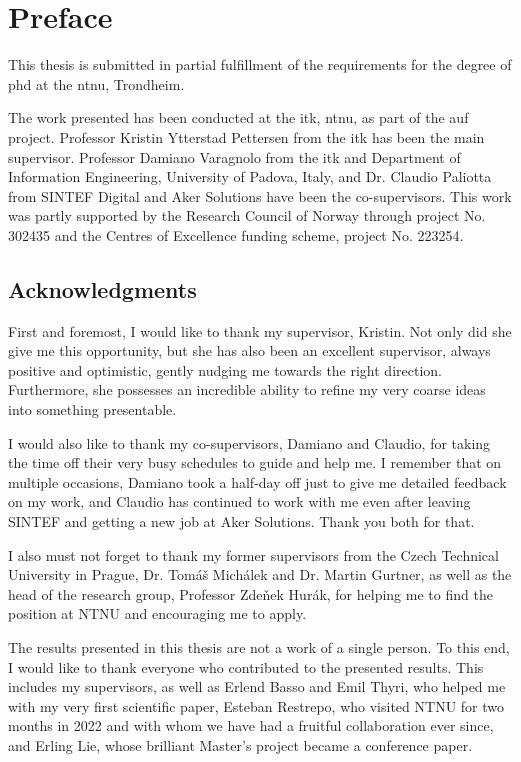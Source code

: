 \chapter*{Preface}

This thesis is submitted in partial fulfillment of the requirements for the degree of \gls{phd} at the \gls{ntnu}, Trondheim.

The work presented has been conducted at the \gls{itk}, \gls{ntnu}, as part of the \gls{auf} project.
Professor Kristin Ytterstad Pettersen from the \gls{itk} has been the main supervisor. 
Professor Damiano Varagnolo from the \gls{itk} and Department of Information Engineering, University of Padova, Italy, and Dr. Claudio Paliotta from SINTEF Digital and Aker Solutions have been the co-supervisors.
This work was partly supported by the Research Council of Norway through project No. 302435 and the Centres of Excellence funding scheme, project No. 223254.

\section*{Acknowledgments}

First and foremost, I would like to thank my supervisor, Kristin.
Not only did she give me this opportunity, but she has also been an excellent supervisor, always positive and optimistic, gently nudging me towards the right direction. 
Furthermore, she possesses an incredible ability to refine my very coarse ideas into something presentable.

I would also like to thank my co-supervisors, Damiano and Claudio, for taking the time off their very busy schedules to guide and help me.
I remember that on multiple occasions, Damiano took a half-day off just to give me detailed feedback on my work, and Claudio has continued to work with me even after leaving SINTEF and getting a new job at Aker Solutions.
Thank you both for that.

I also must not forget to thank my former supervisors from the Czech Technical University in Prague, Dr. Tomáš Michálek and Dr. Martin Gurtner, as well as the head of the research group, Professor Zdeňek Hurák, for helping me to find the position at NTNU and encouraging me to apply.

The results presented in this thesis are not a work of a single person.
To this end, I would like to thank everyone who contributed to the presented results.
This includes my supervisors, as well as Erlend Basso and Emil Thyri, who helped me with my very first scientific paper, Esteban Restrepo, who visited NTNU for two months in 2022 and with whom we have had a fruitful collaboration ever since, and Erling Lie, whose brilliant Master's project became a conference paper.

